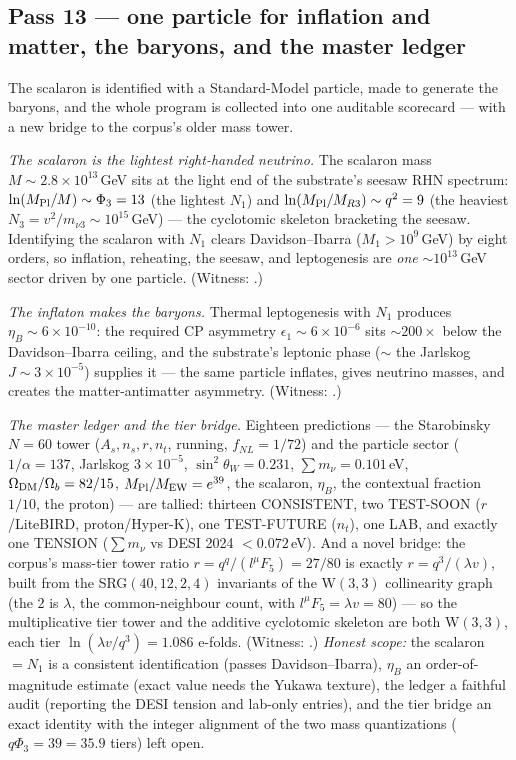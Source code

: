 \documentclass[11pt]{article}
\begin{document}
\subsection{Pass 13 --- one particle for inflation and matter, the baryons, and the master ledger}
\label{sec:capstone-thirteen}

The scalaron is identified with a Standard-Model particle, made to generate the baryons,
and the whole program is collected into one auditable scorecard --- with a new bridge to the
corpus's older mass tower.

\emph{The scalaron is the lightest right-handed neutrino.} The scalaron mass
$M\sim2.8\times10^{13}$\,GeV sits at the light end of the substrate's seesaw RHN spectrum:
$\ln(M_{\rm Pl}/M)\sim\Phi_3=13$ (the lightest $N_1$) and $\ln(M_{\rm Pl}/M_{R3})\sim q^2=9$
(the heaviest $N_3=v^2/m_{\nu3}\sim10^{15}$\,GeV) --- the cyclotomic skeleton bracketing the
seesaw. Identifying the scalaron with $N_1$ clears Davidson--Ibarra ($M_1>10^9$\,GeV) by
eight orders, so inflation, reheating, the seesaw, and leptogenesis are \emph{one}
$\sim10^{13}$\,GeV sector driven by one particle. (Witness:
.)

\emph{The inflaton makes the baryons.} Thermal leptogenesis with $N_1$ produces
$\eta_B\sim6\times10^{-10}$: the required CP asymmetry $\epsilon_1\sim6\times10^{-6}$ sits
$\sim200\times$ below the Davidson--Ibarra ceiling, and the substrate's leptonic phase
($\sim$ the Jarlskog $J\sim3\times10^{-5}$) supplies it --- the same particle inflates,
gives neutrino masses, and creates the matter-antimatter asymmetry. (Witness:
.)

\emph{The master ledger and the tier bridge.} Eighteen predictions --- the Starobinsky
$N=60$ tower ($A_s,n_s,r,n_t$, running, $f_{NL}=1/72$) and the particle sector
($1/\alpha=137$, Jarlskog $3\times10^{-5}$, $\sin^2\theta_W=0.231$, $\sum m_\nu=0.101$\,eV,
$\Omega_{\rm DM}/\Omega_b=82/15$, $M_{\rm Pl}/M_{\rm EW}=e^{39}$, the scalaron, $\eta_B$, the
contextual fraction $1/10$, the proton) --- are tallied: thirteen CONSISTENT, two TEST-SOON
($r$/LiteBIRD, proton/Hyper-K), one TEST-FUTURE ($n_t$), one LAB, and exactly one TENSION
($\sum m_\nu$ vs DESI 2024 $<0.072$\,eV). And a novel bridge: the corpus's mass-tier tower
ratio $r=q^q/(l^\mu F_5)=27/80$ is exactly $r=q^3/(\lambda v)$, built from the
SRG$(40,12,2,4)$ invariants of the W$(3,3)$ collinearity graph (the $2$ is $\lambda$, the
common-neighbour count, with $l^\mu F_5=\lambda v=80$) --- so the multiplicative tier tower
and the additive cyclotomic skeleton are both W$(3,3)$, each tier $\ln(\lambda v/q^3)=1.086$
e-folds. (Witness: .) \emph{Honest scope:} the
scalaron $=N_1$ is a consistent identification (passes Davidson--Ibarra), $\eta_B$ an
order-of-magnitude estimate (exact value needs the Yukawa texture), the ledger a faithful
audit (reporting the DESI tension and lab-only entries), and the tier bridge an exact
identity with the integer alignment of the two mass quantizations ($q\Phi_3=39=35.9$ tiers)
left open.
\end{document}
